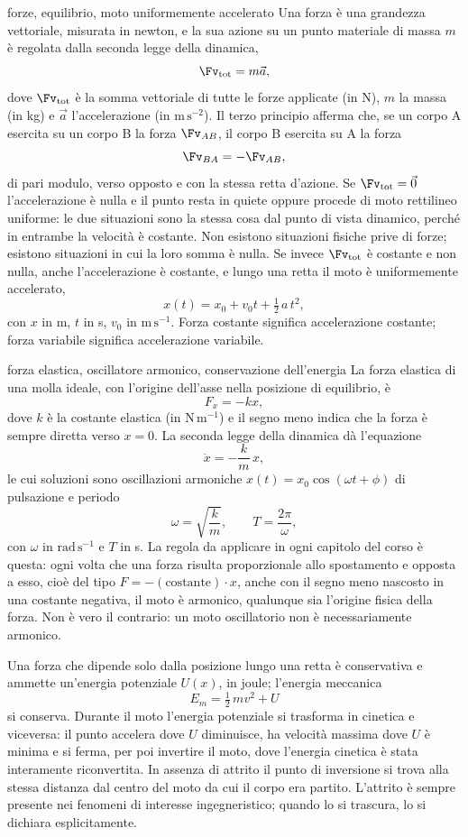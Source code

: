 \documentclass[main.tex]{subfiles}
\begin{document}
\begin{richiamo}{forze, equilibrio, moto uniformemente accelerato}
Una forza è una grandezza vettoriale, misurata in newton, e la sua azione su un punto materiale di massa $m$ è regolata dalla seconda legge della dinamica,
\[
\Fv_{\mathrm{tot}}=m\vec a ,
\]
dove $\Fv_{\mathrm{tot}}$ è la somma vettoriale di tutte le forze applicate (in N), $m$ la massa (in kg) e $\vec a$ l'accelerazione (in $\mathrm{m\,s^{-2}}$). Il terzo principio afferma che, se un corpo A esercita su un corpo B la forza $\Fv_{AB}$, il corpo B esercita su A la forza
\[
\Fv_{BA}=-\Fv_{AB},
\]
di pari modulo, verso opposto e con la stessa retta d'azione. Se $\Fv_{\mathrm{tot}}=\vec 0$ l'accelerazione è nulla e il punto resta in quiete oppure procede di moto rettilineo uniforme: le due situazioni sono la stessa cosa dal punto di vista dinamico, perché in entrambe la velocità è costante. Non esistono situazioni fisiche prive di forze; esistono situazioni in cui la loro somma è nulla. Se invece $\Fv_{\mathrm{tot}}$ è costante e non nulla, anche l'accelerazione è costante, e lungo una retta il moto è uniformemente accelerato,
\[
x(t)=x_0+v_0t+\tfrac12\,a\,t^2 ,
\]
con $x$ in m, $t$ in s, $v_0$ in $\mathrm{m\,s^{-1}}$. Forza costante significa accelerazione costante; forza variabile significa accelerazione variabile.
\end{richiamo}

\begin{richiamo}{forza elastica, oscillatore armonico, conservazione dell'energia}
La forza elastica di una molla ideale, con l'origine dell'asse nella posizione di equilibrio, è
\[
F_x=-kx ,
\]
dove $k$ è la costante elastica (in $\mathrm{N\,m^{-1}}$) e il segno meno indica che la forza è sempre diretta verso $x=0$. La seconda legge della dinamica dà l'equazione
\[
\ddot x=-\frac{k}{m}\,x ,
\]
le cui soluzioni sono oscillazioni armoniche $x(t)=x_0\cos(\omega t+\phi)$ di pulsazione e periodo
\[
\omega=\sqrt{\frac{k}{m}},\qquad T=\frac{2\pi}{\omega},
\]
con $\omega$ in $\mathrm{rad\,s^{-1}}$ e $T$ in s. La regola da applicare in ogni capitolo del corso è questa: ogni volta che una forza risulta proporzionale allo spostamento e opposta a esso, cioè del tipo $F=-(\mathrm{costante})\cdot x$, anche con il segno meno nascosto in una costante negativa, il moto è armonico, qualunque sia l'origine fisica della forza. Non è vero il contrario: un moto oscillatorio non è necessariamente armonico.

Una forza che dipende solo dalla posizione lungo una retta è conservativa e ammette un'energia potenziale $U(x)$, in joule; l'energia meccanica
\[
E_m=\tfrac12\,mv^2+U
\]
si conserva. Durante il moto l'energia potenziale si trasforma in cinetica e viceversa: il punto accelera dove $U$ diminuisce, ha velocità massima dove $U$ è minima e si ferma, per poi invertire il moto, dove l'energia cinetica è stata interamente riconvertita. In assenza di attrito il punto di inversione si trova alla stessa distanza dal centro del moto da cui il corpo era partito. L'attrito è sempre presente nei fenomeni di interesse ingegneristico; quando lo si trascura, lo si dichiara esplicitamente.
\end{richiamo}
\end{document}
